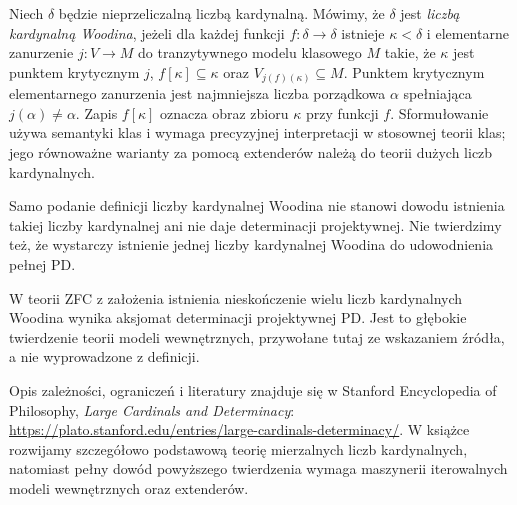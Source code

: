 \begin{definicja}
\label{def:woodin-cardinal}
Niech $\delta$ będzie nieprzeliczalną liczbą
kardynalną. Mówimy, że $\delta$ jest
\emph{liczbą kardynalną Woodina}, jeżeli dla
każdej funkcji $f:\delta\to\delta$ istnieje
$\kappa<\delta$ i elementarne zanurzenie
$j:V\to M$ do tranzytywnego modelu klasowego $M$
takie, że $\kappa$ jest punktem krytycznym $j$,
$f[\kappa]\subseteq\kappa$ oraz
$V_{j(f)(\kappa)}\subseteq M$.
Punktem krytycznym elementarnego zanurzenia jest
najmniejsza liczba porządkowa $\alpha$ spełniająca
$j(\alpha)\ne\alpha$. Zapis $f[\kappa]$ oznacza
obraz zbioru $\kappa$ przy funkcji $f$.
Sformułowanie używa semantyki klas i wymaga
precyzyjnej interpretacji w stosownej teorii klas;
jego równoważne warianty za pomocą extenderów
należą do teorii dużych liczb kardynalnych.
\end{definicja}

\begin{uwaga}
Samo podanie definicji liczby kardynalnej Woodina
nie stanowi dowodu istnienia takiej liczby
kardynalnej ani nie daje determinacji projektywnej.
Nie twierdzimy też, że wystarczy istnienie jednej
liczby kardynalnej Woodina do udowodnienia pełnej PD.
\end{uwaga}

\begin{twierdzenie}
\label{thm:martin-steel-projective}
W teorii ZFC z założenia istnienia nieskończenie
wielu liczb kardynalnych Woodina wynika
aksjomat determinacji projektywnej $\mathrm{PD}$.
Jest to głębokie twierdzenie teorii modeli
wewnętrznych, przywołane tutaj ze wskazaniem
źródła, a nie wyprowadzone z definicji.
\end{twierdzenie}
\begin{uwaga}
Opis zależności, ograniczeń i literatury znajduje się
w Stanford Encyclopedia of Philosophy,
\emph{Large Cardinals and Determinacy}:
\url{https://plato.stanford.edu/entries/large-cardinals-determinacy/}.
W książce rozwijamy szczegółowo podstawową teorię
mierzalnych liczb kardynalnych, natomiast pełny
dowód powyższego twierdzenia wymaga maszynerii
iterowalnych modeli wewnętrznych oraz extenderów.
\end{uwaga}

